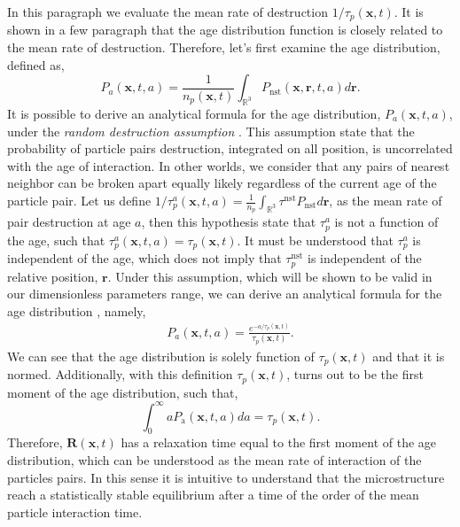 In this paragraph we evaluate the mean rate of destruction $1/\tau_p(\textbf{x},t)$. 
It is shown in a few paragraph that the age distribution function is closely related to the mean rate of destruction. 
Therefore, let's first examine the age distribution, defined as, 
\begin{equation*}
    P_a(\textbf{x},t,a)
    = \frac{1}{n_p(\textbf{x},t)}
    \int_{\mathbb{R}^3}
    P_\text{nst}(\textbf{x},\textbf{r},t,a)
    d\textbf{r}.
\end{equation*} 
It is possible to derive an analytical formula for the age distribution, $P_a(\textbf{x},t,a)$, under the \textit{random destruction assumption} \citep{zhang2023evolution}.
This assumption state that the probability of particle pairs destruction, integrated on all position, is uncorrelated with the age of interaction.
In other worlds, we consider that any pairs of nearest neighbor can be broken apart equally likely regardless of the current age of the particle pair. 
Let us define $1/\tau_p^a(\textbf{x},t,a) = \frac{1}{n_p}\int_{\mathbb{R}^3}\tau^\text{nst} P_\text{nst}d\textbf{r}$, as the mean rate of pair destruction at age $a$, then this hypothesis state that $\tau^a_p$ is not a function of the age, such that $\tau^a_p(\textbf{x},t,a) = \tau_p(\textbf{x},t)$. 
It must be understood that $\tau^a_p$ is independent of the age, which does not imply that $\tau^\text{nst}_p$ is independent of the relative position, $\textbf{r}$.
Under this assumption, which will be shown to be valid in our dimensionless parameters range, we can derive an analytical formula for the age distribution \citep{zhang2023evolution}, namely,
\begin{align}
    P_a(\textbf{x},t, a)  
    =\frac{e^{-a/\tau_p(\textbf{x},t)}}{\tau_p(\textbf{x},t)}.
    \label{eq:Pa}
\end{align} 
We can see that the age distribution is solely function of $\tau_p(\textbf{x},t)$ and that it is normed.
Additionally, with this definition $\tau_p(\textbf{x},t)$, turns out to be the first moment of the age distribution, such that, 
\begin{equation*}
    \int_{0}^\infty
    a P_\text{a}(\textbf{x},t,a)
    da
    =\tau_p(\textbf{x},t). 
\end{equation*}
Therefore, $\textbf{R}(\textbf{x},t)$ has a relaxation time equal to the first moment of the age distribution, which can be understood as the mean rate of interaction of the particles pairs. 
In this sense it is intuitive to understand that the microstructure reach a statistically stable equilibrium after a time of the order of the mean particle interaction time. 

